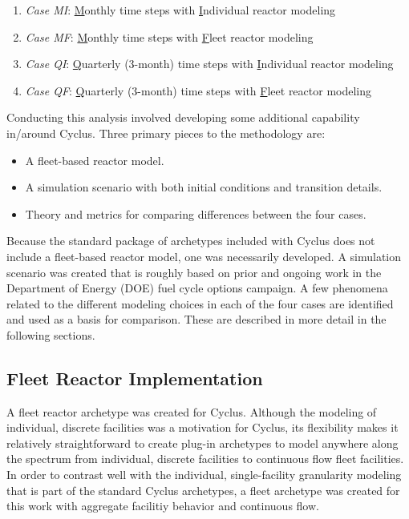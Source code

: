 \documentclass{style}
\begin{document}
\begin{enumerate}

    \item \emph{Case MI}: \underline{M}onthly time steps with \underline{I}ndividual reactor modeling
    \item \emph{Case MF}: \underline{M}onthly time steps with \underline{F}leet reactor modeling
    \item \emph{Case QI}: \underline{Q}uarterly (3-month) time steps with \underline{I}ndividual reactor modeling
    \item \emph{Case QF}: \underline{Q}uarterly (3-month) time steps with \underline{F}leet reactor modeling

\end{enumerate}

Conducting this analysis involved developing some additional capability
in/around Cyclus.  Three primary pieces to the methodology are:

\begin{itemize}

    \item A fleet-based reactor model.

    \item A simulation scenario with both initial conditions and transition
        details.

    \item Theory and metrics for comparing differences between the four cases.

\end{itemize}

Because the standard package of archetypes included with Cyclus does not
include a fleet-based reactor model, one was necessarily developed. A
simulation scenario was created that is roughly based on prior and ongoing
work in the Department of Energy (DOE) fuel cycle options campaign.  A few
phenomena related to the different modeling choices in each of the four cases
are identified and used as a basis for comparison.  These are
described in more detail in the following sections.

\subsection{Fleet Reactor Implementation}

A fleet reactor archetype was created for Cyclus.  Although the modeling of
individual, discrete facilities was a motivation for Cyclus, its flexibility
makes it relatively straightforward to create plug-in archetypes to model
anywhere along the spectrum from individual, discrete facilities to
continuous flow fleet facilities.  In order to contrast well with the individual,
single-facility granularity modeling that is part of the standard Cyclus archetypes, 
a fleet archetype was created for this work with aggregate facilitiy behavior and
continuous flow.
\end{document}
